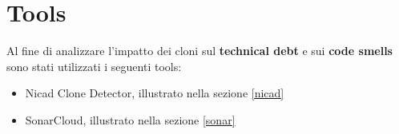 \chapter{Tools}\label{cap3}
Al fine di analizzare l'impatto dei cloni sul \textbf{technical debt} e sui \textbf{code smells} sono stati utilizzati i seguenti tools:
\begin{itemize}
\item Nicad Clone Detector, illustrato nella sezione \ref{nicad}
\item SonarCloud, illustrato nella sezione \ref{sonar}
\end{itemize}
 \label{nicad}
 
